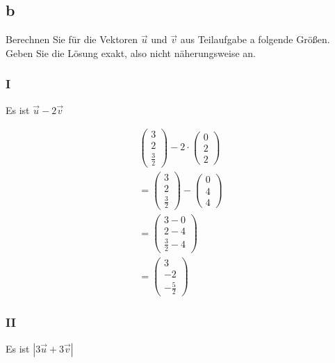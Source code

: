 \subsection{b}
Berechnen Sie für die Vektoren $\vec{u}$ und $\vec{v}$ aus Teilaufgabe a
folgende Größen. Geben Sie die Lösung exakt, also nicht näherungsweise an.

\subsubsection{I}
Es ist $\vec{u} - 2\vec{v}$

\begin{align*}
    \begin{pmatrix}
        3 \\ 2 \\ \frac{3}{2}
    \end{pmatrix} - 2 \cdot \begin{pmatrix}
                                0 \\ 2 \\ 2
                            \end{pmatrix} \\
    = \begin{pmatrix}
          3 \\ 2 \\ \frac{3}{2}
      \end{pmatrix} - \begin{pmatrix}
                          0 \\ 4 \\ 4
                      \end{pmatrix}       \\
    = \begin{pmatrix}
          3 - 0 \\ 2 - 4 \\ \frac{3}{2} - 4
      \end{pmatrix}     \\
    = \begin{pmatrix}
          3 \\ -2 \\ -\frac{5}{2}
      \end{pmatrix}
\end{align*}

\subsubsection{II}
Es ist $\left|3\vec{u} + 3\vec{v}\right|$

